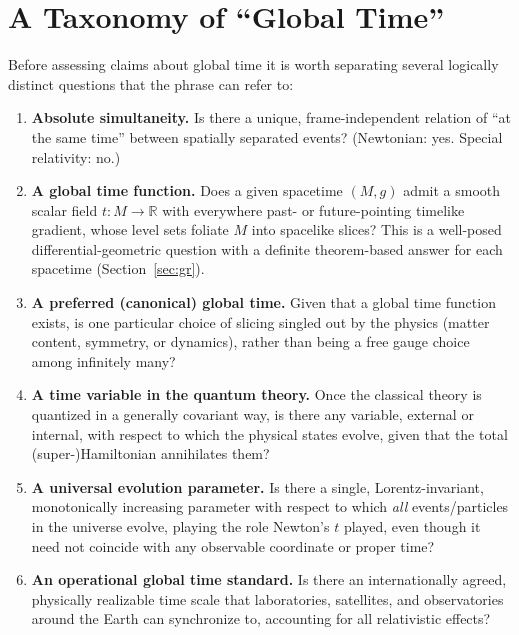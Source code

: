 \documentclass[11pt]{article}
\begin{document}
\section{A Taxonomy of ``Global Time''}
\label{sec:taxonomy}

Before assessing claims about global time it is worth separating several logically distinct questions that the phrase can refer to:

\begin{enumerate}[label=(\alph*)]
\item \textbf{Absolute simultaneity.} Is there a unique, frame-independent relation of ``at the same time'' between spatially separated events? (Newtonian: yes. Special relativity: no.)
\item \textbf{A global time function.} Does a given spacetime $(M,g)$ admit a smooth scalar field $t:M\to\mathbb{R}$ with everywhere past- or future-pointing timelike gradient, whose level sets foliate $M$ into spacelike slices? This is a well-posed differential-geometric question with a definite theorem-based answer for each spacetime (Section~\ref{sec:gr}).
\item \textbf{A preferred (canonical) global time.} Given that a global time function exists, is one particular choice of slicing singled out by the physics (matter content, symmetry, or dynamics), rather than being a free gauge choice among infinitely many?
\item \textbf{A time variable in the quantum theory.} Once the classical theory is quantized in a generally covariant way, is there any variable, external or internal, with respect to which the physical states evolve, given that the total (super-)Hamiltonian annihilates them?
\item \textbf{A universal evolution parameter.} Is there a single, Lorentz-invariant, monotonically increasing parameter with respect to which \emph{all} events/particles in the universe evolve, playing the role Newton's $t$ played, even though it need not coincide with any observable coordinate or proper time?
\item \textbf{An operational global time standard.} Is there an internationally agreed, physically realizable time scale that laboratories, satellites, and observatories around the Earth can synchronize to, accounting for all relativistic effects?
\end{enumerate}
\end{document}
